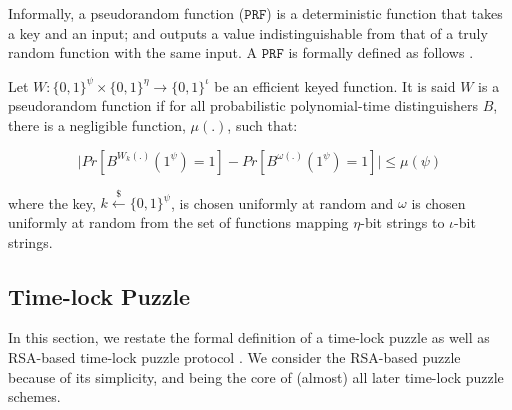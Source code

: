 Informally, a pseudorandom function ($\mathtt{PRF}$) is a deterministic function that takes a key and an input; and outputs a value  indistinguishable from that of  a truly random function with the same input.   A $\mathtt{PRF}$ is formally defined as follows \cite{DBLP:books/crc/KatzLindell2007}. 
\begin{definition} Let $W:\{0,1\}^{\scriptscriptstyle\psi}\times \{0,1\}^{\scriptscriptstyle \eta}\rightarrow \{0,1\}^{\scriptscriptstyle  \iota}$ be an efficient  keyed function. It is said $W$ is a pseudorandom function if for all probabilistic polynomial-time distinguishers $B$, there is a negligible function, $\mu(.)$, such that:

\begin{equation*}
\bigg | Pr[B^{\scriptscriptstyle W_{k}(.)}(1^{\scriptscriptstyle \psi})=1]- Pr[B^{\scriptscriptstyle \omega(.)}(1^{\scriptscriptstyle \psi})=1] \bigg |\leq \mu(\psi)
\end{equation*}

where  the key, $k\stackrel{\scriptscriptstyle\$}\leftarrow\{0,1\}^{\scriptscriptstyle\psi}$, is chosen uniformly at random and $\omega$ is chosen uniformly at random from the set of functions mapping $\eta$-bit strings to $\iota$-bit strings. 
\end{definition}




 
\subsection{ Time-lock  Puzzle}\label{Time-lock-Encryption} In this section, we restate the formal definition of a time-lock puzzle as well as RSA-based  time-lock puzzle protocol \cite{Rivest:1996:TPT:888615}. We consider the RSA-based puzzle because of its simplicity, and  being the core of (almost) all later time-lock puzzle schemes.


